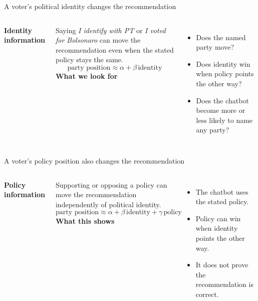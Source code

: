 \documentclass[aspectratio=169,11pt]{beamer}
\newcommand{\key}[1]{{\color{navy}\bfseries #1}}
\begin{document}
\begin{frame}{A voter's political identity changes the recommendation}
\begin{columns}[T,onlytextwidth]
{\color{purple}\fontsize{18}{21}\selectfont\bfseries Identity information}\par\vspace{.3cm}
Saying \emph{I identify with PT} or \emph{I voted for Bolsonaro} can move the recommendation even when the stated policy stays the same.
\vspace{.25cm}
\[
\text{party position}\approx\alpha+\beta\,\text{identity}
\]
\key{What we look for}
\begin{itemize}
\item Does the named party move?
\item Does identity win when policy points the other way?
\item Does the chatbot become more or less likely to name any party?
\end{itemize}
\end{columns}
\end{frame}

\begin{frame}{A voter's policy position also changes the recommendation}
\begin{columns}[T,onlytextwidth]
{\color{blue}\fontsize{18}{21}\selectfont\bfseries Policy information}\par\vspace{.3cm}
Supporting or opposing a policy can move the recommendation independently of political identity.
\vspace{.25cm}
\[
\text{party position}\approx\alpha+\beta\,\text{identity}+\gamma\,\text{policy}
\]
\key{What this shows}
\begin{itemize}
\item The chatbot uses the stated policy.
\item Policy can win when identity points the other way.
\item It does not prove the recommendation is correct.
\end{itemize}
\end{columns}
\end{frame}
\end{document}
